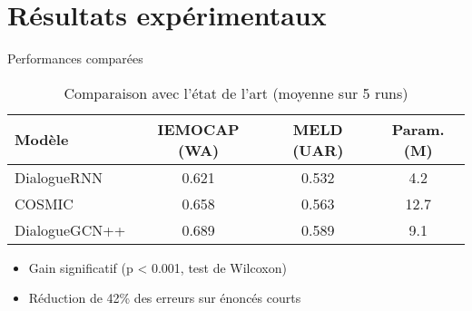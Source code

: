 \documentclass[10pt, aspectratio=169]{beamer} %
\begin{document}
\section{Résultats expérimentaux}
\begin{frame}{Performances comparées}
    \begin{table}
        \centering
        \begin{tabular}{lccc}
            \toprule
            Modèle & IEMOCAP (WA) & MELD (UAR) & Param. (M) \\
            \midrule
            DialogueRNN & 0.621 & 0.532 & 4.2 \\
            COSMIC & 0.658 & 0.563 & 12.7 \\
            \alert{DialogueGCN++} & \alert{0.689} & \alert{0.589} & 9.1 \\
            \bottomrule
        \end{tabular}
        \caption{Comparaison avec l'état de l'art (moyenne sur 5 runs)}
    \end{table}
    
    \begin{itemize}
        \item Gain significatif (p < 0.001, test de Wilcoxon)
        \item Réduction de 42\% des erreurs sur énoncés courts
    \end{itemize}
    
    \footnotesize
\end{frame}
\end{document}
